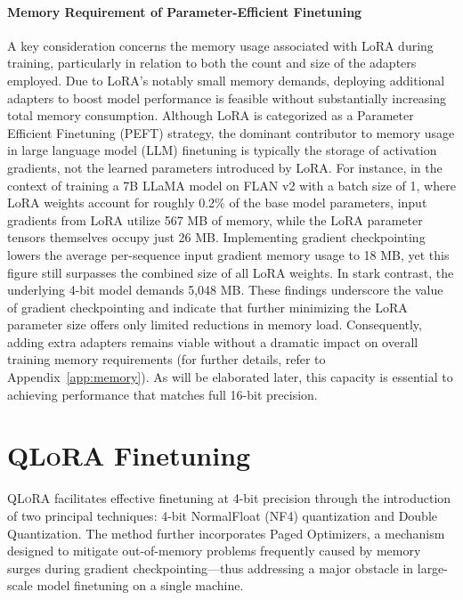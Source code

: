 \paragraph{Memory Requirement of Parameter-Efficient Finetuning} A key consideration concerns the memory usage associated with LoRA during training, particularly in relation to both the count and size of the adapters employed. Due to LoRA's notably small memory demands, deploying additional adapters to boost model performance is feasible without substantially increasing total memory consumption. Although LoRA is categorized as a Parameter Efficient Finetuning (PEFT) strategy, the dominant contributor to memory usage in large language model (LLM) finetuning is typically the storage of activation gradients, not the learned parameters introduced by LoRA. For instance, in the context of training a 7B LLaMA model on FLAN v2 with a batch size of 1, where LoRA weights account for roughly 0.2\% of the base model parameters\citep{hu2021lora,liu2022few}, input gradients from LoRA utilize 567 MB of memory, while the LoRA parameter tensors themselves occupy just 26 MB. Implementing gradient checkpointing~\citep{chen2016training} lowers the average per-sequence input gradient memory usage to 18 MB, yet this figure still surpasses the combined size of all LoRA weights. In stark contrast, the underlying 4-bit model demands 5,048 MB. These findings underscore the value of gradient checkpointing and indicate that further minimizing the LoRA parameter size offers only limited reductions in memory load. Consequently, adding extra adapters remains viable without a dramatic impact on overall training memory requirements (for further details, refer to Appendix~\ref{app:memory}). As will be elaborated later, this capacity is essential to achieving performance that matches full 16-bit precision.

\section{\textsc{QLoRA} Finetuning}

\textsc{QLoRA} facilitates effective finetuning at 4-bit precision through the introduction of two principal techniques: 4-bit NormalFloat (NF4) quantization and Double Quantization. The method further incorporates Paged Optimizers, a mechanism designed to mitigate out-of-memory problems frequently caused by memory surges during gradient checkpointing—thus addressing a major obstacle in large-scale model finetuning on a single machine.

